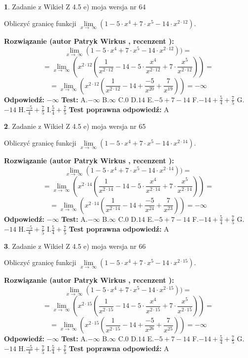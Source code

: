 \documentclass[12pt, a4paper]{article}
\theoremstyle{definition} %
\newtheorem{zad}{}
\newcommand{\zadStart}[1]{\begin{zad}#1\newline}
\newcommand{\zadStop}{\end{zad}}
\newcommand{\rozwStart}[2]{\noindent \textbf{Rozwiązanie (autor #1 , recenzent #2): }\newline}
\newcommand{\rozwStop}{\newline}
\newcommand{\odpStart}{\noindent \textbf{Odpowiedź:}\newline}
\newcommand{\odpStop}{\newline}
\newcommand{\testStart}{\noindent \textbf{Test:}\newline}
\newcommand{\testStop}{\newline}
\newcommand{\kluczStart}{\noindent \textbf{Test poprawna odpowiedź:}\newline}
\newcommand{\kluczStop}{\newline}
\begin{document}
\zadStart{Zadanie z Wikieł Z 4.5 e) moja wersja nr 64}



Obliczyć granicę funkcji  $\lim\limits_{x\to\ \infty}(1 - 5 \cdot x^{4}+7 \cdot x^{5}- 14 \cdot x^{2\cdot12})$.
\zadStop
\rozwStart{Patryk Wirkus}{}
$$\lim\limits_{x\to\ \infty}(1 - 5 \cdot x^{4}+7 \cdot x^{5}- 14 \cdot x^{2\cdot12}))=$$
$$=\lim\limits_{x\to\ \infty}(x^{2\cdot12}(\frac{1}{x^{2\cdot12}}-14 -5 \cdot \frac{x^{4}}{x^{2\cdot12}}+7 \cdot \frac{x^{5}}{x^{2\cdot12}}))=$$
$$=\lim\limits_{x\to\ \infty}(x^{2\cdot12}(\frac{1}{x^{2\cdot12}}-14 + \frac{-5}{x^{20}}+ \frac{7}{x^{19}}))=-\infty$$
\rozwStop
\odpStart
$-\infty$
\odpStop
\testStart
A.$-\infty$ B.$\infty$ C.$0$ D.$14$ E.$-5 + 7 - 14$
F.$-14+\frac{5}{4}+\frac{7}{5}$ G.$-14$
H.$\frac{-5}{4}+\frac{7}{5}$
I.$\frac{5}{4}+\frac{7}{5}$
\testStop
\kluczStart
A
\kluczStop



\zadStart{Zadanie z Wikieł Z 4.5 e) moja wersja nr 65}



Obliczyć granicę funkcji  $\lim\limits_{x\to\ \infty}(1 - 5 \cdot x^{4}+7 \cdot x^{5}- 14 \cdot x^{2\cdot14})$.
\zadStop
\rozwStart{Patryk Wirkus}{}
$$\lim\limits_{x\to\ \infty}(1 - 5 \cdot x^{4}+7 \cdot x^{5}- 14 \cdot x^{2\cdot14}))=$$
$$=\lim\limits_{x\to\ \infty}(x^{2\cdot14}(\frac{1}{x^{2\cdot14}}-14 -5 \cdot \frac{x^{4}}{x^{2\cdot14}}+7 \cdot \frac{x^{5}}{x^{2\cdot14}}))=$$
$$=\lim\limits_{x\to\ \infty}(x^{2\cdot14}(\frac{1}{x^{2\cdot14}}-14 + \frac{-5}{x^{24}}+ \frac{7}{x^{23}}))=-\infty$$
\rozwStop
\odpStart
$-\infty$
\odpStop
\testStart
A.$-\infty$ B.$\infty$ C.$0$ D.$14$ E.$-5 + 7 - 14$
F.$-14+\frac{5}{4}+\frac{7}{5}$ G.$-14$
H.$\frac{-5}{4}+\frac{7}{5}$
I.$\frac{5}{4}+\frac{7}{5}$
\testStop
\kluczStart
A
\kluczStop



\zadStart{Zadanie z Wikieł Z 4.5 e) moja wersja nr 66}



Obliczyć granicę funkcji  $\lim\limits_{x\to\ \infty}(1 - 5 \cdot x^{4}+7 \cdot x^{5}- 14 \cdot x^{2\cdot15})$.
\zadStop
\rozwStart{Patryk Wirkus}{}
$$\lim\limits_{x\to\ \infty}(1 - 5 \cdot x^{4}+7 \cdot x^{5}- 14 \cdot x^{2\cdot15}))=$$
$$=\lim\limits_{x\to\ \infty}(x^{2\cdot15}(\frac{1}{x^{2\cdot15}}-14 -5 \cdot \frac{x^{4}}{x^{2\cdot15}}+7 \cdot \frac{x^{5}}{x^{2\cdot15}}))=$$
$$=\lim\limits_{x\to\ \infty}(x^{2\cdot15}(\frac{1}{x^{2\cdot15}}-14 + \frac{-5}{x^{26}}+ \frac{7}{x^{25}}))=-\infty$$
\rozwStop
\odpStart
$-\infty$
\odpStop
\testStart
A.$-\infty$ B.$\infty$ C.$0$ D.$14$ E.$-5 + 7 - 14$
F.$-14+\frac{5}{4}+\frac{7}{5}$ G.$-14$
H.$\frac{-5}{4}+\frac{7}{5}$
I.$\frac{5}{4}+\frac{7}{5}$
\testStop
\kluczStart
A
\kluczStop
\end{document}
